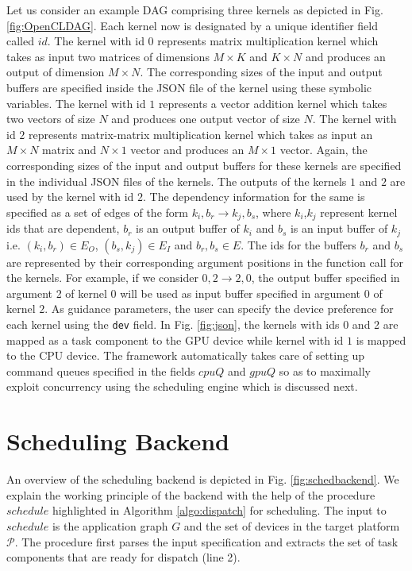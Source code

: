     \par Let us consider an example DAG comprising three kernels as depicted in Fig. \ref{fig:OpenCLDAG}. Each kernel now is designated by a unique identifier field called $id$. The kernel with id $0$ represents matrix multiplication kernel which takes as input two matrices of dimensions $M \times K$ and $K \times N$ and produces an output of dimension $M \times N$. The corresponding sizes of the input and output buffers are specified inside the JSON file of the kernel using these symbolic variables. The kernel with id $1$ represents a vector addition kernel which takes two vectors of size $N$ and produces one output vector of size $N$. The kernel with id $2$ represents  matrix-matrix multiplication kernel which takes as input an $M\times N$ matrix and $N\times 1$ vector and produces an $M \times 1$ vector. Again, the corresponding sizes of the input and output buffers for these kernels are specified in the individual JSON files of the kernels. The outputs of the kernels $1$ and $2$ are used by the kernel with id $2$. The dependency information for the same is specified as a set of edges of the form $k_i,b_r \rightarrow k_j,b_s$, where $k_i$,$k_j$ represent kernel ids that are dependent, $b_r$ is an output buffer of $k_i$ and $b_s$ is an input buffer of $k_j$ i.e. $(k_i,b_r) \in E_O$, $(b_s,k_j) \in E_I$ and $b_r,b_s \in E$. The ids for the buffers $b_r$ and $b_s$ are represented by their corresponding argument positions in the function call for the kernels. For example, if we consider $0,2 \rightarrow 2, 0$, the output buffer specified in argument 2 of kernel $0$ will be used as input buffer specified in argument 0 of kernel $2$. As guidance parameters, the user can specify the device preference for each kernel using the {\tt dev} field. In Fig. \ref{fig:json}, the kernels with ids 0 and 2 are mapped as a task component to the GPU device while kernel with id $1$ is mapped to the CPU device. The framework automatically takes care of setting up command queues specified in the fields $cpuQ$ and $gpuQ$ so as to maximally exploit concurrency using the scheduling engine which is discussed next.
    
    \section{Scheduling Backend}
    An overview of the scheduling backend is depicted in Fig. \ref{fig:schedbackend}. We explain the working principle of the backend with the help of the procedure $schedule$ highlighted in Algorithm \ref{algo:dispatch} for scheduling. The input to $schedule$ is the application graph $G$ and the set of devices in the target platform $\mathcal{P}$. The procedure first parses the input specification and extracts the set of task components that are ready for dispatch (line 2).

